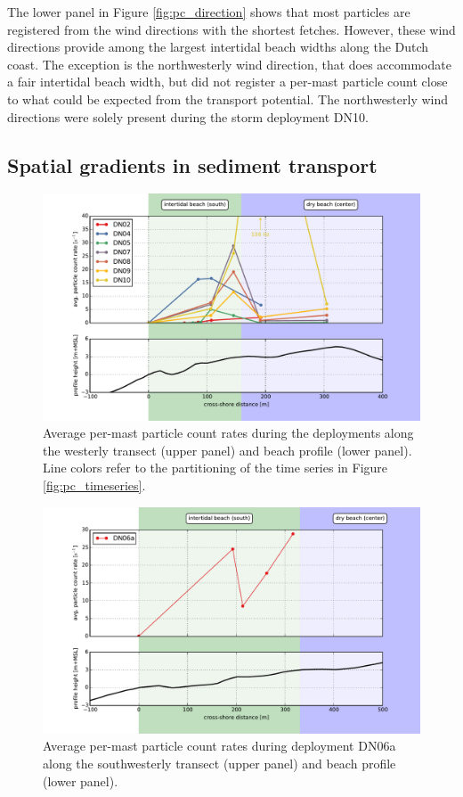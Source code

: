 The lower panel in Figure \ref{fig:pc_direction} shows that most
particles are registered from the wind directions with the shortest
fetches. However, these wind directions provide among the largest
intertidal beach widths along the Dutch coast.  The
exception is the northwesterly wind direction, that does accommodate a
fair intertidal beach width, but did not register a per-mast particle
count close to what could be expected from the transport
potential. The northwesterly wind directions were solely present
during the storm deployment DN10.

\subsection{Spatial gradients in sediment transport}

\begin{figure}
 \centering
  \includegraphics[width=\columnwidth]{../Figures/particlecounts_transects}
  \caption{Average per-mast particle count rates during the deployments
    along the westerly transect (upper panel) and beach profile (lower
    panel). Line colors refer to the partitioning of the time series
    in Figure \ref{fig:pc_timeseries}.}
  \label{fig:pc_transect}
\end{figure}

\begin{figure}
 \centering
  \includegraphics[width=\columnwidth]{../Figures/particlecounts_DN06}
  \caption{Average per-mast particle count rates during deployment DN06a
    along the southwesterly transect (upper panel) and beach profile
    (lower panel).}
  \label{fig:pc_transect_DN06}
\end{figure}


